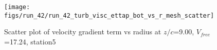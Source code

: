 \begin{figure}[H]
\centering
\texttt{[image: figs/run\_42/run\_42\_turb\_visc\_ettap\_bot\_vs\_r\_mesh\_scatter]}
\caption{Scatter plot of velocity gradient term vs radius at $z/c$=9.00, $V_{free}$=17.24, station5}
\label{fig:run_42_turb_visc_ettap_bot_vs_r_mesh_scatter}
\end{figure}


